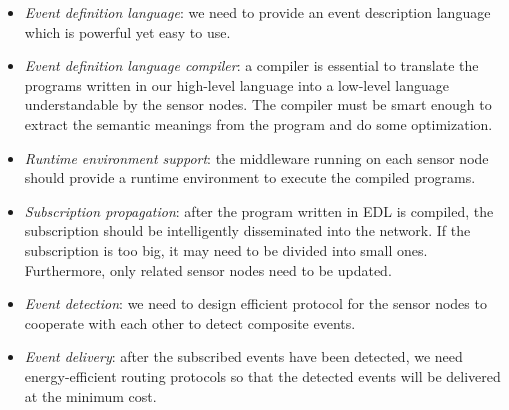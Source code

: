 \begin{itemize}
\item	\emph{Event definition language}: we need to provide an event description language which is powerful yet easy to use.
\item	\emph{Event definition language compiler}: a compiler is essential to translate the programs written in our high-level language into a low-level language understandable by the sensor nodes. The compiler must be smart enough to extract the semantic meanings from the program and do some optimization.
\item	\emph{Runtime environment support}: the middleware running on each sensor node should provide a runtime environment to execute the compiled programs.
\item	\emph{Subscription propagation}: after the program written in EDL is compiled, the subscription should be intelligently disseminated into the network. If the subscription is too big, it may need to be divided into small ones. Furthermore, only related sensor nodes need to be updated.
\item	\emph{Event detection}: we need to design efficient protocol for the sensor nodes to cooperate with each other to detect composite events.
\item	\emph{Event delivery}: after the subscribed events have been detected, we need energy-efficient routing protocols so that the detected events will be delivered at the minimum cost.
\end{itemize}